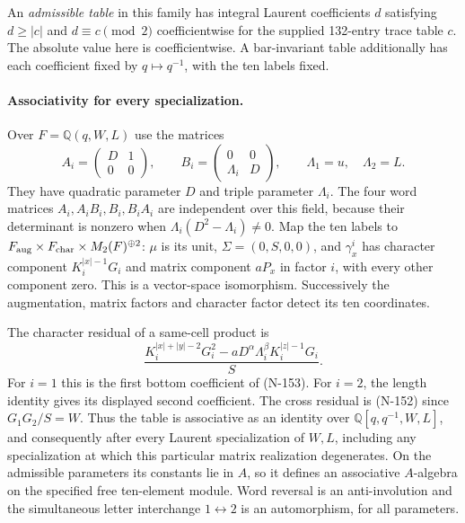 An \emph{admissible table} in this family has integral Laurent
coefficients $d$ satisfying $d\ge|c|$ and $d\equiv c\pmod2$
coefficientwise for the supplied 132-entry trace table $c$.
The absolute value here is coefficientwise.  A bar-invariant table
additionally has each coefficient fixed by $q\mapsto q^{-1}$,
with the ten labels fixed.

\paragraph{Associativity for every specialization.}
Over $F=\mathbb Q(q,W,L)$ use the matrices
\[
 A_i=\begin{pmatrix}D&1\\0&0\end{pmatrix},\qquad
 B_i=\begin{pmatrix}0&0\\\Lambda_i&D\end{pmatrix},
 \qquad\Lambda_1=u,\quad\Lambda_2=L.
 \tag{N-154}
\]
They have quadratic parameter $D$ and triple parameter $\Lambda_i$.
The four word matrices $A_i,A_iB_i,B_i,B_iA_i$ are independent
over this field, because their determinant is nonzero when
$\Lambda_i(D^2-\Lambda_i)\ne0$.  Map the ten labels to
$F_{\rm aug}\times F_{\rm char}\times M_2(F)^{\oplus2}$:
$\mu$ is its unit, $\Sigma=(0,S,0,0)$, and $\gamma^i_x$ has
character component $K_i^{|x|-1}G_i$ and matrix component
$aP_x$ in factor $i$, with every other component zero.
This is a vector-space isomorphism.  Successively the augmentation,
matrix factors and character factor detect its ten coordinates.

The character residual of a same-cell product is
\[
 \frac{K_i^{|x|+|y|-2}G_i^2
       -aD^\alpha\Lambda_i^\beta K_i^{|z|-1}G_i}{S}.
 \tag{N-155}
\]
For $i=1$ this is the first bottom coefficient of (N-153).
For $i=2$, the length identity gives its displayed second coefficient.
The cross residual is (N-152) since $G_1G_2/S=W$.
Thus the table is associative as an identity over
$\mathbb Q[q,q^{-1},W,L]$, and consequently after every Laurent
specialization of $W,L$, including any specialization at which this
particular matrix realization degenerates.  On the admissible
parameters its constants lie in $A$, so it defines an associative
$A$-algebra on the specified free ten-element module.  Word reversal
is an anti-involution and the simultaneous letter interchange
$1\leftrightarrow2$ is an automorphism, for all parameters.


